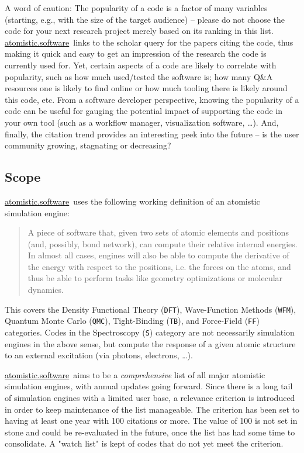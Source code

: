 \documentclass[9pt,review]{livecoms}
\newcommand{\atsoft}{\href{https://atomistic.software}{atomistic.software}\ }
\begin{document}
A word of caution: The popularity of a code is a factor of many variables (starting, e.g., with the size of the target audience) -- please do not choose the code for your next research project merely based on its ranking in this list.
\atsoft links to the scholar query for the papers citing the code, thus making it quick and easy to get an impression of the research the code is currently used for.
Yet, certain aspects of a code are likely to correlate with popularity, such as how much used/tested the software is; how many Q\&A resources one is likely to find online or how much tooling there is likely around this code, etc. 
From a software developer perspective, knowing the popularity of a code can be useful for gauging the potential impact of supporting the code in your own tool (such as a workflow manager, visualization software, \ldots).
And, finally, the citation trend provides an interesting peek into the future -- is the user community growing, stagnating or decreasing?


\subsection{Scope}


\atsoft uses the following working definition of an atomistic simulation engine:

\begin{quote}
A piece of software that, given two sets of atomic elements and positions (and, possibly, bond network), can compute their relative internal energies. 
In almost all cases, engines will also be able to compute the derivative of the energy with respect to the positions, i.e. the forces on the atoms, and thus be able to perform tasks like geometry optimizations or molecular dynamics.
\end{quote}

This covers the Density Functional Theory (\verb|DFT|), Wave-Function Methods (\verb|WFM|), Quantum Monte Carlo (\verb|QMC|), Tight-Binding (\verb|TB|), and Force-Field (\verb|FF|) categories.
Codes in the Spectroscopy (\verb|S|) category are not necessarily simulation engines in the above sense, but compute the response of a given atomic structure to an external excitation (via photons, electrons, \ldots).

\atsoft aims to be a \emph{comprehensive} list of all major atomistic simulation engines, with annual updates going forward. 
Since there is a long tail of simulation engines with a limited user base, a relevance criterion is introduced in order to keep maintenance of the list manageable.
The criterion has been set to having at least one year with 100 citations or more.
The value of 100 is not set in stone and could be re-evaluated in the future, once the list has had some time to consolidate.
A "watch list" is kept of codes that do not yet meet the criterion.
\end{document}
